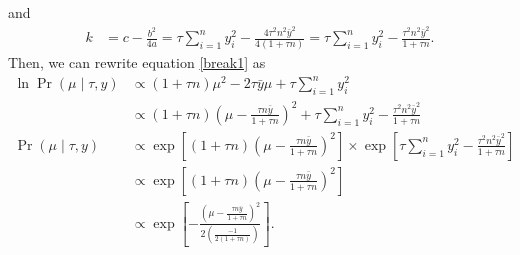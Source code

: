\documentclass[letterpaper]{amsart}
\begin{document}
and
\begin{align}
    k &= c-\frac{b^2}{4a}
    = \tau \sum_{i=1}^n y_i^2
    -\frac{4\tau^2 n^2\bar{y}^2}{4\left(1+\tau n\right)}
    = \tau \sum_{i=1}^n y_i^2
    -\frac{\tau^2 n^2\bar{y}^2}{1+\tau n}.
\end{align}
Then, we can rewrite equation \ref{break1} as
\begin{align}
    \ln
    \Pr(\mu\mid\tau, y)
    &\propto
    \left(1+\tau n\right) \mu^2
    -2\tau\bar{y}\mu
    + \tau \sum_{i=1}^n y_i^2
    \\
    &\propto
    \left(1+\tau n\right)
    \left(\mu - \frac{\tau n\bar{y}}{1+\tau n}\right)^2
    + \tau \sum_{i=1}^n y_i^2
    -\frac{\tau^2 n^2\bar{y}^2}{1+\tau n}
    \\
    \Pr(\mu\mid\tau, y)
    &\propto
    \exp\left[
    \left(1+\tau n\right)
    \left(\mu - \frac{\tau n\bar{y}}{1+\tau n}\right)^2
    \right]
    \times
    \exp\left[
    \tau \sum_{i=1}^n y_i^2
    -\frac{\tau^2 n^2\bar{y}^2}{1+\tau n}
    \right]
    \\
    &\propto
    \exp\left[
    \left(1+\tau n\right)
    \left(\mu - \frac{\tau n\bar{y}}{1+\tau n}\right)^2
    \right]
    \\
    &\propto
    \exp\left[
    -\frac{
    \left(\mu - \frac{\tau n\bar{y}}{1+\tau n}\right)^2
    }{  
    2\left(\frac{-1}{2\left(1+\tau n\right)}\right)
    }
    \right].
\end{align}
\end{document}
